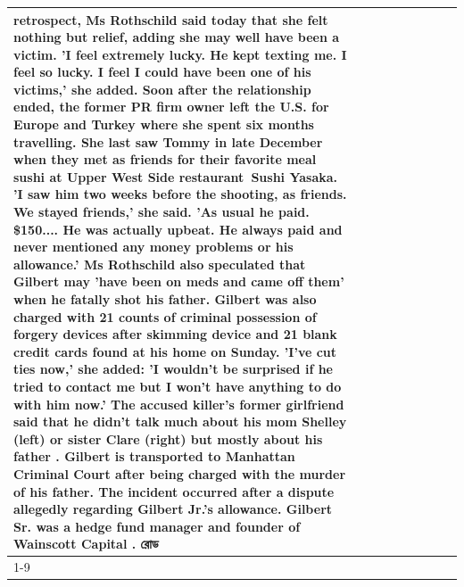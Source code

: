 \begin{table}[H]
\begin{tabular}{lllrlllll}
retrospect, Ms Rothschild said today that she felt nothing but relief, adding she may well have been a victim. 'I feel extremely lucky. He kept texting me. I feel so lucky. I feel I could have been one of his victims,' she added. Soon after the relationship ended, the former PR firm owner left the U.S. for Europe and Turkey where she spent six months  travelling. She last saw Tommy in late December when they met as friends for their favorite meal sushi at Upper West Side restaurant Sushi Yasaka. 'I saw him two weeks before the shooting, as friends. We stayed friends,' she said. 'As usual he paid. \$150.... He was actually upbeat. He always paid and never mentioned any money problems or his allowance.' Ms Rothschild also speculated that Gilbert may 'have been on meds and came off them' when he fatally shot his father. Gilbert was also charged with 21 counts of criminal possession of forgery devices after skimming device and 21 blank credit cards found at his home on Sunday. 'I've cut ties now,' she added: 'I wouldn’t be surprised if he tried to contact me but I won’t have anything to do with him now.' The accused killer's former girlfriend said that he didn't talk much about his mom Shelley (left) or sister Clare (right) but mostly about his father . Gilbert is transported to Manhattan Criminal Court  after being charged with the murder of his father. The incident occurred after a dispute allegedly regarding Gilbert Jr.'s allowance. Gilbert Sr. was a hedge fund manager and founder of Wainscott Capital . রোড \\
\cline{1-9}

\end{tabular}
\end{table}
